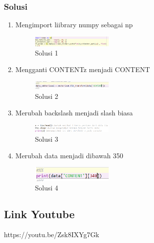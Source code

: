         \subsubsection{Solusi}
        \begin{enumerate}
            \item Mengimport liibrary numpy sebagai np
            \begin{figure}[H]
                \includegraphics[width=4cm]{figures/1174086/chapter4/solution1.png}
                \centering
                \caption{Solusi 1}
            \end{figure}
            \item Mengganti CONTENTz menjadi CONTENT
            \begin{figure}[H]
                \includegraphics[width=4cm]{figures/1174086/chapter4/solution2.png}
                \centering
                \caption{Solusi 2}
            \end{figure}
            \item Merubah backslash menjadi slash biasa
            \begin{figure}[H]
                \includegraphics[width=4cm]{figures/1174086/chapter4/solution3.png}
                \centering
                \caption{Solusi 3}
            \end{figure}
            \item Merubah data menjadi dibawah 350
            \begin{figure}[H]
                \includegraphics[width=4cm]{figures/1174086/chapter4/solution4.png}
                \centering
                \caption{Solusi 4}
            \end{figure}
        \end{enumerate}
        
\subsection{Link Youtube}
https://youtu.be/Zsk8IXYg7Gk